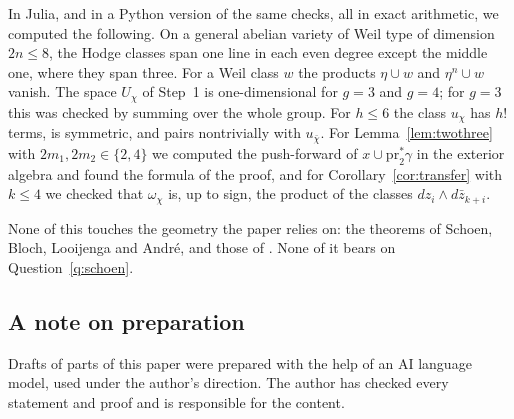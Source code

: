 \documentclass[11pt]{amsart}
\theoremstyle{definition}
\theoremstyle{remark}
\begin{document}
In Julia, and in a Python version of the same checks, all in exact
arithmetic, we computed the following. On a general abelian variety of Weil
type of dimension $2n\le8$, the Hodge classes span one line in each even
degree except the middle one, where they span three. For a Weil class $w$
the products $\eta\cup w$ and $\eta^{n}\cup w$ vanish. The space $U_{\chi}$
of Step~1 is one-dimensional for $g=3$ and $g=4$; for $g=3$ this was checked
by summing over the whole group. For $h\le6$ the class $u_{\chi}$ has $h!$
terms, is symmetric, and pairs nontrivially with $u_{\bar\chi}$. For
Lemma~\ref{lem:twothree} with $2m_{1},2m_{2}\in\{2,4\}$ we computed the
push-forward of $x\cup\mathrm{pr}_{2}^{*}\gamma$ in the exterior algebra and
found the formula of the proof, and for Corollary~\ref{cor:transfer} with
$k\le4$ we checked that $\omega_{\chi}$ is, up to sign, the product of the
classes $dz_{i}\wedge d\bar z_{k+i}$.

None of this touches the geometry the paper relies on: the theorems of
Schoen, Bloch, Looijenga and Andr\'e, and those of \cite{BhH8}. None of it
bears on Question~\ref{q:schoen}.

\subsection*{A note on preparation}
Drafts of parts of this paper were prepared with the help of an AI language
model, used under the author's direction. The author has checked every
statement and proof and is responsible for the content.
\end{document}

